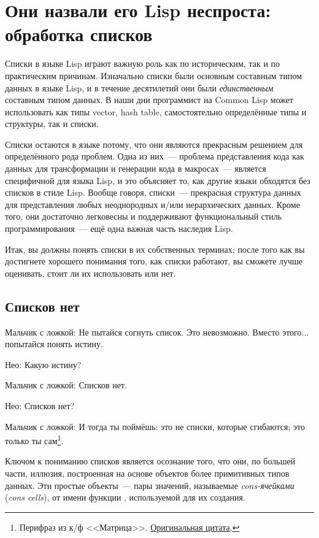 \chapter{Они назвали его Lisp неспроста: обработка списков}
\label{ch:12}

Списки в языке Lisp играют важную роль как по историческим, так и по практическим
причинам. Изначально списки были основным составным типом данных в языке Lisp, и в течение
десятилетий они были \textit{единственным} составным типом данных. В наши дни программист на
Common Lisp может использовать как типы vector, hash table, самостоятельно определённые
типы и структуры, так и списки.

Списки остаются в языке потому, что они являются прекрасным решением для определённого
рода проблем. Одна из них~--- проблема представления кода как данных для трансформации и
генерации кода в макросах~--- является специфичной для языка Lisp, и это объясняет то, как
другие языки обходятся без списков в стиле Lisp. Вообще говоря, списки~--- прекрасная
структура данных для представления любых неоднородных и/или иерархических данных. Кроме
того, они достаточно легковесны и поддерживают функциональный стиль программирования~--- ещё
одна важная часть наследия Lisp.

Итак, вы должны понять списки в их собственных терминах; после того как вы достигнете
хорошего понимания того, как списки работают, вы сможете лучше оценивать, стоит ли их
использовать или нет.

\section{Списков нет}

Мальчик с ложкой: Не пытайся согнуть список. Это невозможно. Вместо этого... попытайся
понять истину.

Нео: Какую истину?

Мальчик с ложкой: Списков нет.

Нео: Списков нет?

Мальчик с ложкой: И тогда ты поймёшь: это не списки, которые сгибаются; это только ты
сам\footnote{Перифраз из к/ф <<Матрица>>.
  \href{http://us.imdb.com/Quotes?0133093}{Оригинальная цитата}.}.

Ключом к пониманию списков является осознание того, что они, по большей части, иллюзия,
построенная на основе объектов более примитивных типов данных. Эти простые объекты~--- пары
значений, называемые \textit{cons-ячейками} (\textit{cons cells}), от имени функции
, используемой для их создания.

